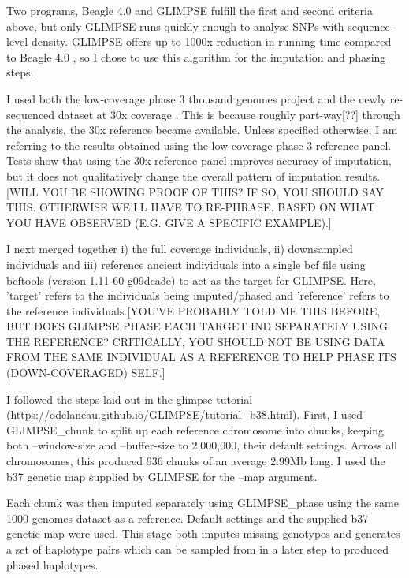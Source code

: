 {\color{red}Two} programs, Beagle 4.0 \cite{Browning2007} and GLIMPSE \cite{rubinacci2021efficient} fulfill the first and second criteria above, but only GLIMPSE runs quickly enough to analyse SNPs with sequence-level density. GLIMPSE offers up to 1000x reduction in running time compared to Beagle 4.0 \cite{rubinacci2021efficient}, so I chose to use this algorithm for the imputation and phasing steps.   

I used both the low-coverage phase 3 thousand genomes project \cite{1000GenomesProjectConsortium2015} and the newly re-sequenced dataset at 30x coverage \cite{byrska2021high}. This is because {\color{red}roughly part-way[??]} through the analysis, the 30x reference became available. Unless specified otherwise, I am referring to the results obtained using the low-coverage phase 3 reference panel. {\color{red}Tests show that using the 30x reference panel improves accuracy of imputation, but it does not qualitatively change the overall pattern of imputation results.[WILL YOU BE SHOWING PROOF OF THIS? IF SO, YOU SHOULD SAY THIS. OTHERWISE WE'LL HAVE TO RE-PHRASE, BASED ON WHAT YOU HAVE OBSERVED (E.G. GIVE A SPECIFIC EXAMPLE).]} 

I next merged together i) the full coverage individuals, ii) downsampled individuals and iii) reference ancient individuals into a single bcf file using bcftools (version 1.11-60-g09dca3e) \cite{li2011statistical} to act as the target for GLIMPSE. Here, 'target' refers to the individuals being imputed/phased and 'reference' refers to the reference individuals.{\color{red}[YOU'VE PROBABLY TOLD ME THIS BEFORE, BUT DOES GLIMPSE PHASE EACH TARGET IND SEPARATELY USING THE REFERENCE? CRITICALLY, YOU SHOULD NOT BE USING DATA FROM THE SAME INDIVIDUAL AS A REFERENCE TO HELP PHASE ITS (DOWN-COVERAGED) SELF.]}

I followed the steps laid out in the glimpse tutorial (\url{https://odelaneau.github.io/GLIMPSE/tutorial_b38.html}). First, I used GLIMPSE\_chunk to split up each reference chromosome into chunks, keeping both --window-size and --buffer-size to 2,000,000, their default settings. Across all chromosomes, this produced 936 chunks of an average 2.99Mb long. I used the b37 genetic map supplied by GLIMPSE for the --map argument. 

Each chunk was then imputed separately using GLIMPSE\_phase using the same 1000 genomes dataset as a reference. Default settings and the supplied b37 genetic map were used. This stage both imputes missing genotypes and generates a set of haplotype pairs which can be sampled from in a later step to produced phased haplotypes.

